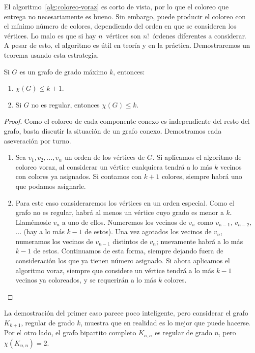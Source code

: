   El algoritmo~\ref{alg:coloreo-voraz} es corto de vista,
  por lo que el coloreo que entrega no necesariamente es bueno.
  Sin embargo,
  puede producir el coloreo con el mínimo número de colores,
  dependiendo del orden en que se consideren los vértices.
  Lo malo es que si hay \(n\)~vértices
  son \(n!\)~órdenes diferentes a considerar.
  A pesar de esto,
  el algoritmo es útil en teoría y en la práctica.
  Demostraremos un teorema usando esta estrategia.
  \begin{theorem}
    \label{theo:grafo-grados-cromatico}
    Si \(G\) es un grafo de grado máximo \(k\),
    entonces:
    \begin{enumerate}
    \item
      \(\chi(G) \le k + 1\).
    \item
      Si \(G\) no es regular,
      entonces \(\chi(G) \le k\).
    \end{enumerate}
  \end{theorem}
  \begin{proof}
    Como el coloreo de cada componente conexo
    es independiente del resto del grafo,
    basta discutir la situación de un grafo conexo.
    Demostramos cada aseveración por turno.
    \begin{enumerate}
    \item
      Sea \(v_1, v_2, \dotsc, v_n\)
      un orden de los vértices de \(G\).
      Si aplicamos el algoritmo de coloreo voraz,
      al considerar un vértice cualquiera
      tendrá a lo más \(k\) vecinos con colores ya asignados.
      Si contamos con \(k + 1\) colores,
      siempre habrá uno que podamos asignarle.
    \item
      Para este caso consideraremos los vértices
      en un orden especial.
      Como el grafo no es regular,
      habrá al menos un vértice cuyo grado es menor a \(k\).
      Llamémosle \(v_n\) a uno de ellos.
      Numeremos los vecinos de \(v_n\)
      como \(v_{n - 1}\), \(v_{n - 2}\), \(\dots\)
      (hay a lo más \(k - 1\) de estos).
      Una vez agotados los vecinos de \(v_n\),
      numeramos los vecinos de \(v_{n - 1}\) distintos de \(v_n\);
      nuevamente habrá a lo más \(k - 1\) de estos.
      Continuamos de esta forma,
      siempre dejando fuera de consideración
      los que ya tienen número asignado.
      Si ahora aplicamos el algoritmo voraz,
      siempre que considere un vértice
      tendrá a lo más \(k - 1\) vecinos ya coloreados,
      y se requerirán a lo más \(k\) colores.
    \qedhere
    \end{enumerate}
  \end{proof}
  La demostración del primer caso parece poco inteligente,
  pero considerar el grafo \(K_{k + 1}\),
  regular de grado \(k\),
  muestra que en realidad es lo mejor que puede hacerse.
  Por el otro lado,
  el grafo bipartito completo \(K_{n, n}\)
  es regular de grado \(n\),
  pero \(\chi(K_{n, n}) = 2\).

